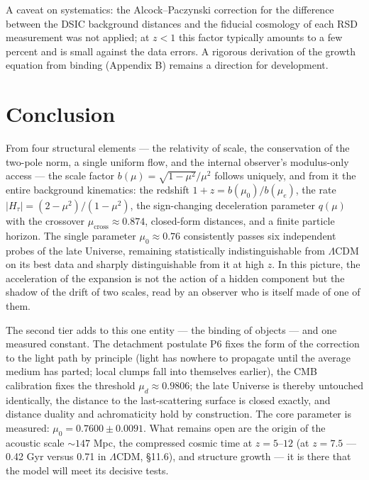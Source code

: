 \documentclass{article}
\begin{document}
A caveat on systematics: the Alcock--Paczynski correction for the difference between the DSIC background distances and the fiducial cosmology of each RSD measurement was not applied; at $z < 1$ this factor typically amounts to a few percent and is small against the data errors. A rigorous derivation of the growth equation from binding (Appendix B) remains a direction for development.

\section{Conclusion}

From four structural elements --- the relativity of scale, the conservation of the two-pole norm, a single uniform flow, and the internal observer's modulus-only access --- the scale factor $b(\mu) = \sqrt{1-\mu^2}/\mu^2$ follows uniquely, and from it the entire background kinematics: the redshift $1+z = b(\mu_0)/b(\mu_e)$, the rate $|H_\tau| = (2-\mu^2)/(1-\mu^2)$, the sign-changing deceleration parameter $q(\mu)$ with the crossover $\mu_{\text{cross}} \approx 0.874$, closed-form distances, and a finite particle horizon. The single parameter $\mu_0 \approx 0.76$ consistently passes six independent probes of the late Universe, remaining statistically indistinguishable from $\Lambda$CDM on its best data and sharply distinguishable from it at high $z$. In this picture, the acceleration of the expansion is not the action of a hidden component but the shadow of the drift of two scales, read by an observer who is itself made of one of them.

The second tier adds to this one entity --- the binding of objects --- and one measured constant. The detachment postulate P6 fixes the form of the correction to the light path by principle (light has nowhere to propagate until the average medium has parted; local clumps fall into themselves earlier), the CMB calibration fixes the threshold $\mu_d \approx 0.9806$; the late Universe is thereby untouched identically, the distance to the last-scattering surface is closed exactly, and distance duality and achromaticity hold by construction. The core parameter is measured: $\mu_0 = 0.7600 \pm 0.0091$. What remains open are the origin of the acoustic scale ${\sim}147$ Mpc, the compressed cosmic time at $z = 5\text{--}12$ (at $z = 7.5$ --- 0.42 Gyr versus 0.71 in $\Lambda$CDM, \S11.6), and structure growth --- it is there that the model will meet its decisive tests.
\end{document}
